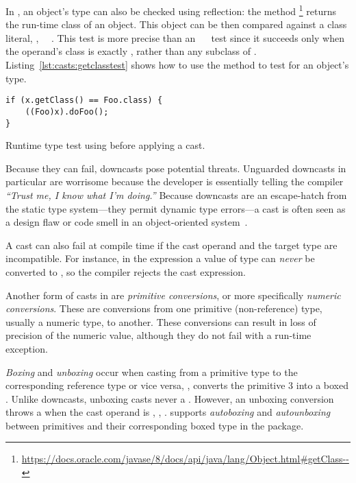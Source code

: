 In \java{}, an object's type can also be checked using reflection:
the  method%
\footnote{\url{https://docs.oracle.com/javase/8/docs/api/java/lang/Object.html\#getClass--}}
returns the run-time class of an object.
This  object can be then compared against a class literal, \eg,
~\code{==}~.
This test is more precise than an ~~ test since it succeeds only when the operand's class is exactly ,
rather than any subclass of .
Listing~\ref{lst:casts:getclasstest} shows how to use the  method to test for an object's type.

\begin{listing}
\begin{verbatim}
if (x.getClass() == Foo.class) {
	((Foo)x).doFoo(); 
}
\end{verbatim}
\caption{Runtime type test using  before applying a cast.}
\label{lst:casts:getclasstest}
\end{listing}

Because they can fail,
downcasts pose potential threats.
Unguarded downcasts in particular are
worrisome because the developer is essentially telling the compiler
\emph{``Trust me, I know what I'm doing.''}
Because downcasts are an escape-hatch from the static type system---they
permit dynamic type errors---a cast is often seen as a design flaw or code
smell in an object-oriented system~\citep{tufanoWhenWhyYour2015}.

A cast can also fail at compile time if the cast operand and the target type are incompatible.
For instance, in the expression  a value of type
 can \emph{never} be converted to , so the compiler
rejects the cast expression.

Another form of casts in \java{} are \emph{primitive conversions}, or more specifically
\emph{numeric conversions}. These are conversions from
one primitive (non-reference) type, usually a numeric type, to another. These conversions can result
in loss of precision of the numeric value, although they do not fail with a
run-time exception.

\emph{Boxing} and \emph{unboxing} occur when casting from a primitive type to the corresponding reference type or vice versa,
\eg{},  converts the primitive  3 into a boxed .
Unlike downcasts, unboxing casts never  a .
However, an unboxing conversion throws a  when 
the cast operand is , \eg{}, .%
\java{} supports \emph{autoboxing} and \emph{autounboxing} between primitives and their corresponding boxed type in the  package.

